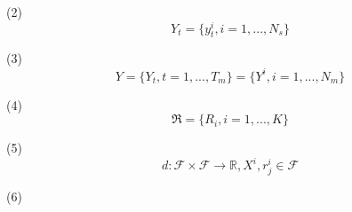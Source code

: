 (2)
\begin{equation}
  Y_t = \{y_t^i, i = 1, ..., N_s\}
\end{equation}

(3)
\begin{equation}
  Y = \{Y_t, t = 1, ..., T_m\} = \{Y^i, i = 1, ..., N_m\}
\end{equation}

(4)
\begin{equation}
  \Re = \{R_i, i = 1, ..., K\}
\end{equation}


(5)
\begin{equation}
  d: \mathcal{F} \times \mathcal{F} \rightarrow \mathbb{R},    X^i , r_j^i \in \mathcal{F}
\end{equation}

(6)
